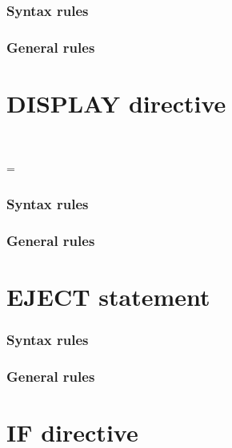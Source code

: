 \subsubsection{Syntax rules}

\subsubsection{General rules}

\section{DISPLAY directive}

\begin{syntax}[\miscextcolour]
  \begin{1=}
    \directiveindicator \\
    \textdollar
  \end{1=}
   \sourcetext
  \begin{0-1}
     = 
  \end{0-1}
\end{syntax}

\subsubsection{Syntax rules}

\subsubsection{General rules}

\section{EJECT statement}

\begin{syntax}[\miscextcolour]
\end{syntax}

\subsubsection{Syntax rules}

\subsubsection{General rules}

\section{IF directive}

